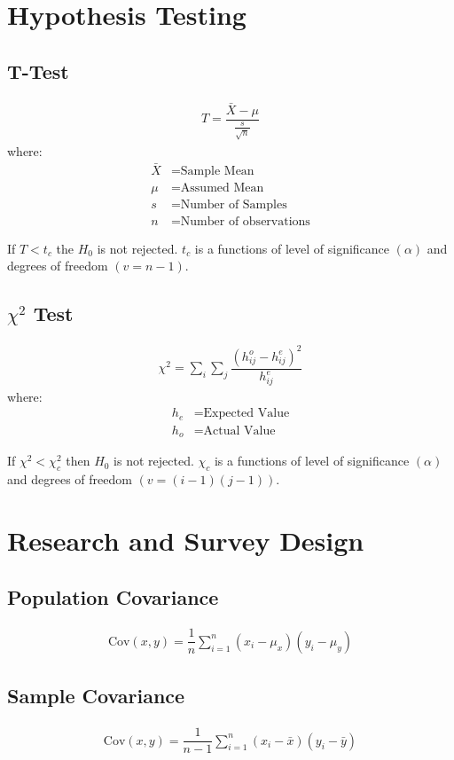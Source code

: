 \documentclass[openany,b5paper]{article}
\begin{document}
\section{Hypothesis Testing}
\subsection{T-Test}
\begin{align}
T = \dfrac{\bar{X}-\mu}{\frac{s}{\sqrt{n}}}
\end{align}
where:
\begin{align*}
\bar{X} &= \text{Sample Mean}\\
\mu &= \text{Assumed Mean}\\
s &= \text{Number of Samples}\\
n &= \text{Number of observations}
\end{align*}

If $T < t_c$ the $H_0$ is not rejected. $t_c$ is a functions of level of significance $(\alpha)$ and degrees of freedom $(v = n -1)$.

\subsection{$\chi^2$ Test}
\begin{align}
\chi^2 = \sum_i \sum_j \dfrac{(h_{ij}^o-h_{ij}^e)^2}{h_{ij}^e}
\end{align}
where:
\begin{align*}
h_e &= \text{Expected Value}\\
h_o &= \text{Actual Value}
\end{align*}

If $\chi^2 < \chi_c^2$ then $H_0$ is not rejected. $\chi_c$ is a functions of level of significance $(\alpha)$ and degrees of freedom $(v = (i-1)(j-1))$.

\section{Research and Survey Design}
\subsection{Population Covariance}
\begin{align}
\text{Cov}(x,y)=\dfrac{1}{n} \sum_{i=1}^n (x_i-\mu_x)(y_i-\mu_y)
\end{align}
\subsection{Sample Covariance}
\begin{align}
\text{Cov}(x,y)=\dfrac{1}{n-1} \sum_{i=1}^n (x_i-\bar{x})(y_i-\bar{y})
\end{align}
\end{document}

